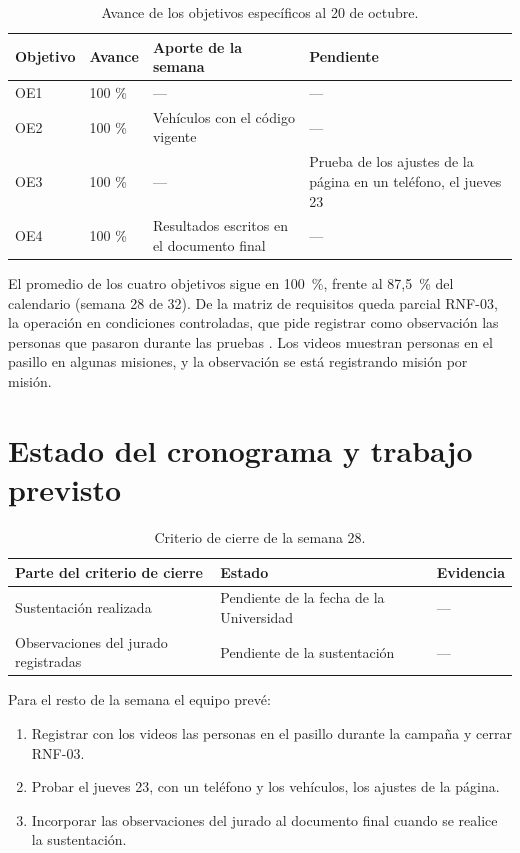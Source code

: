 \documentclass[12pt,letterpaper]{article}
\begin{document}
\begin{table}[H]
\centering
\small
\caption{Avance de los objetivos específicos al 20 de octubre.}
\begin{tabular}{@{}p{1.9cm}p{1.6cm}p{5.2cm}p{5.9cm}@{}}
\toprule
\textbf{Objetivo} & \textbf{Avance} & \textbf{Aporte de la semana} & \textbf{Pendiente} \\ \midrule
OE1 & 100 \% & --- & --- \\
OE2 & 100 \% & Vehículos con el código vigente & --- \\
OE3 & 100 \% & --- & Prueba de los ajustes de la página en un teléfono, el jueves 23 \\
OE4 & 100 \% & Resultados escritos en el documento final & --- \\ \bottomrule
\end{tabular}
\end{table}

El promedio de los cuatro objetivos sigue en 100~\%, frente al 87,5~\% del calendario (semana 28 de 32). De la matriz de requisitos queda parcial RNF-03, la operación en condiciones controladas, que pide registrar como observación las personas que pasaron durante las pruebas \cite{requisitos}. Los videos muestran personas en el pasillo en algunas misiones, y la observación se está registrando misión por misión.

\section{Estado del cronograma y trabajo previsto}

\begin{table}[H]
\centering
\small
\caption{Criterio de cierre de la semana 28.}
\begin{tabular}{@{}p{6cm}p{6cm}p{2.6cm}@{}}
\toprule
\textbf{Parte del criterio de cierre} & \textbf{Estado} & \textbf{Evidencia} \\ \midrule
Sustentación realizada & Pendiente de la fecha de la Universidad & --- \\
Observaciones del jurado registradas & Pendiente de la sustentación & --- \\ \bottomrule
\end{tabular}
\end{table}

Para el resto de la semana el equipo prevé:

\begin{enumerate}
    \item Registrar con los videos las personas en el pasillo durante la campaña y cerrar RNF-03.
    \item Probar el jueves 23, con un teléfono y los vehículos, los ajustes de la página.
    \item Incorporar las observaciones del jurado al documento final cuando se realice la sustentación.
\end{enumerate}
\end{document}
